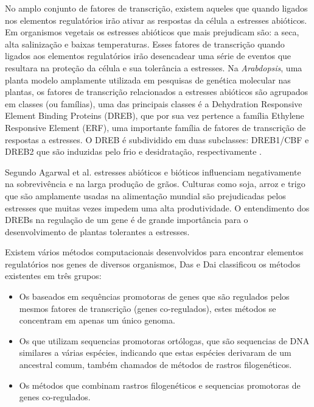 No amplo conjunto de fatores de transcrição, existem aqueles que quando ligados nos elementos regulatórios irão ativar as respostas da célula a estresses abióticos. Em organismos vegetais os estresses abióticos que mais prejudicam são: a seca, alta salinização e baixas temperaturas. Esses fatores de transcrição quando ligados aos elementos regulatórios irão desencadear uma série de eventos que resultara na proteção da célula e sua tolerância a estresses. Na \textit{Arabdopsis}, uma planta modelo amplamente utilizada em pesquisas de genética molecular nas plantas, os fatores de transcrição relacionados a estresses abióticos são agrupados em classes (ou famílias), uma das principais classes é a Dehydration Responsive Element Binding Proteins (DREB), que por sua vez pertence a família Ethylene Responsive Element (ERF), uma importante família de fatores de transcrição de respostas a estresses. O DREB é subdividido em duas subclasses: DREB1/CBF e DREB2 que são induzidas pelo frio e desidratação, respectivamente \cite{Agarwal2006}.

Segundo Agarwal et al.\cite{Agarwal2006} estresses abióticos e bióticos influenciam negativamente na sobrevivência e na larga produção de grãos. Culturas como soja, arroz e trigo que são amplamente usadas na alimentação mundial são prejudicadas pelos estresses que muitas vezes impedem uma alta produtividade. O entendimento dos DREBs na regulação de um gene é de grande importância para o desenvolvimento de plantas tolerantes a estresses.


Existem vários métodos computacionais desenvolvidos para encontrar elementos regulatórios nos genes de diversos organismos, Das e Dai \cite{Das2007} classificou os métodos existentes em três grupos:
\begin{itemize}
\item Os baseados em sequências promotoras de genes que são regulados pelos mesmos fatores de transcrição (genes co-regulados), estes métodos se concentram em apenas um único genoma.

\item Os que utilizam sequencias promotoras ortólogas, que são sequencias de DNA similares a várias espécies, indicando que estas espécies derivaram de um ancestral comum, também chamados de métodos de rastros filogenéticos.

\item Os métodos que combinam rastros filogenéticos e sequencias promotoras de genes co-regulados.
\end{itemize}



